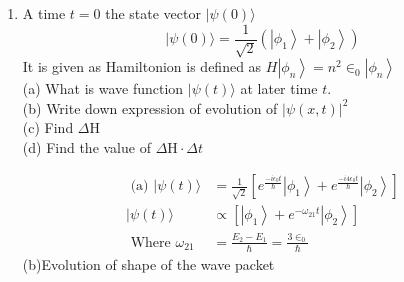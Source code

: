 \begin{enumerate}
\begin{answer}
\begin{align*}
		&=2 \hbar \omega \times \frac{2}{3}+3 \hbar \omega \times \frac{1}{3} \quad\langle H\rangle=\frac{7 \hbar \omega}{3}\\
		\left\langle H^{2}\right\rangle&=\frac{\left\langle\psi\left|H^{2}\right| \psi\right\rangle}{\langle\psi \mid \psi\rangle}=\Sigma P_{n}\left(a_{n}\right) a_{n}^{2}=\frac{2}{3} \times(2 \hbar \omega)^{2}+\frac{1}{3} \times(3 \hbar \omega)^{2}=\frac{8 \hbar^{2} \omega^{2}}{3}+\frac{9 \hbar^{2} \omega^{2}}{3}=\frac{17 \hbar^{2} \omega^{2}}{3}
	\end{align*}
	(d)The error in measurement in $\mathrm{H}$ is given as
	\begin{align*}
	\Delta H=\sqrt{\left\langle H^{2}\right\rangle-\langle H\rangle^{2}} & \left\langle H^{2}\right\rangle=\frac{17 \hbar^{2} \omega^{2}}{3} \\
	\langle H\rangle^{2}=\left(\frac{7 \hbar \omega}{3}\right)^{2}=\frac{49 \hbar^{2} \omega^{2}}{9} & \Delta H=\sqrt{\frac{17}{3}-\frac{49}{9}} \hbar \omega\\
	\Delta H&=\sqrt{\frac{51-49}{9}} \hbar \omega=\frac{\sqrt{2}}{3} \hbar \omega
	\end{align*}
\end{answer}
	\item  A time $t=0$ the state vector $|\psi(0)\rangle$
	$$
	|\psi(0)\rangle=\frac{1}{\sqrt{2}}\left(\left|\phi_{1}\right\rangle+\left|\phi_{2}\right\rangle\right)
	$$
	It is given as Hamiltonion is defined as $H\left|\phi_{n}\right\rangle=n^{2} \in_{0}\left|\phi_{n}\right\rangle$\\
	(a) What is wave function $|\psi(t)\rangle$ at later time $t$.\\
	(b) Write down expression of evolution of $|\psi(x, t)|^{2}$\\
	(c) Find $\Delta \mathrm{H}$\\
	(d) Find the value of $\Delta \mathrm{H} \cdot \Delta t$
\begin{answer}
	\begin{align*}
	\text { (a) }|\psi(t)\rangle&=\frac{1}{\sqrt{2}}\left[e^{\frac{-i \epsilon_{0} t}{\hbar}}\left|\phi_{1}\right\rangle+e^{\frac{-i 4 \epsilon_{0} t}{\hbar}}\left|\phi_{2}\right\rangle\right]\\
	|\psi(t)\rangle &\propto\left[\left|\phi_{1}\right\rangle+e^{-\omega_{21} t}\left|\phi_{2}\right\rangle\right]\\
	\text { Where } \omega_{21}&=\frac{E_{2}-E_{1}}{\hbar}=\frac{3 \in_{0}}{\hbar}
	\end{align*}
	(b)Evolution of shape of the wave packet

\end{answer}
\end{enumerate}
